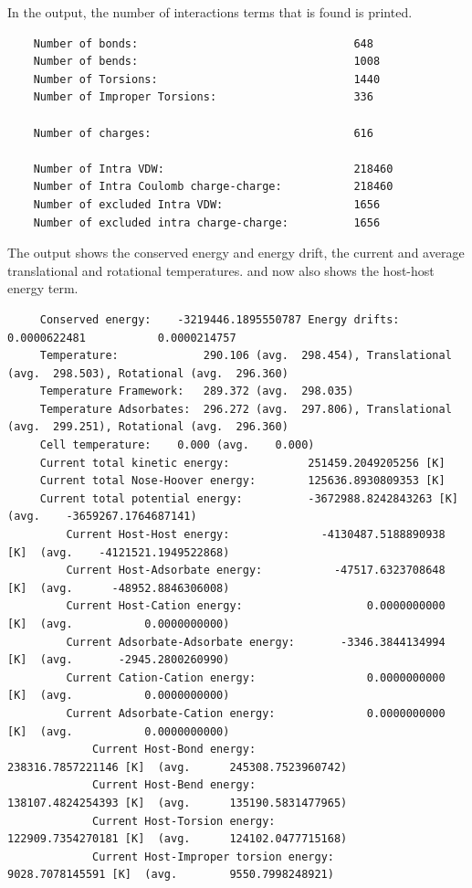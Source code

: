 \noindent
In the output, the number of interactions terms that is found is printed.
\begin{tiny}
\begin{verbatim}
    Number of bonds:                                 648
    Number of bends:                                 1008
    Number of Torsions:                              1440
    Number of Improper Torsions:                     336

    Number of charges:                               616

    Number of Intra VDW:                             218460
    Number of Intra Coulomb charge-charge:           218460
    Number of excluded Intra VDW:                    1656
    Number of excluded intra charge-charge:          1656

\end{verbatim}
\end{tiny}


\noindent
The output shows the conserved energy and energy drift, the current and average translational and rotational temperatures.
and now also shows the host-host energy term.
\begin{tiny}
\begin{verbatim}
     Conserved energy:    -3219446.1895550787 Energy drifts:  0.0000622481           0.0000214757
     Temperature:             290.106 (avg.  298.454), Translational (avg.  298.503), Rotational (avg.  296.360)
     Temperature Framework:   289.372 (avg.  298.035)
     Temperature Adsorbates:  296.272 (avg.  297.806), Translational (avg.  299.251), Rotational (avg.  296.360)
     Cell temperature:    0.000 (avg.    0.000)
     Current total kinetic energy:            251459.2049205256 [K]
     Current total Nose-Hoover energy:        125636.8930809353 [K]
     Current total potential energy:          -3672988.8242843263 [K]  (avg.    -3659267.1764687141)
         Current Host-Host energy:              -4130487.5188890938 [K]  (avg.    -4121521.1949522868)
         Current Host-Adsorbate energy:           -47517.6323708648 [K]  (avg.      -48952.8846306008)
         Current Host-Cation energy:                   0.0000000000 [K]  (avg.           0.0000000000)
         Current Adsorbate-Adsorbate energy:       -3346.3844134994 [K]  (avg.       -2945.2800260990)
         Current Cation-Cation energy:                 0.0000000000 [K]  (avg.           0.0000000000)
         Current Adsorbate-Cation energy:              0.0000000000 [K]  (avg.           0.0000000000)
             Current Host-Bond energy:                  238316.7857221146 [K]  (avg.      245308.7523960742)
             Current Host-Bend energy:                  138107.4824254393 [K]  (avg.      135190.5831477965)
             Current Host-Torsion energy:               122909.7354270181 [K]  (avg.      124102.0477715168)
             Current Host-Improper torsion energy:        9028.7078145591 [K]  (avg.        9550.7998248921)
\end{verbatim}
\end{tiny}


